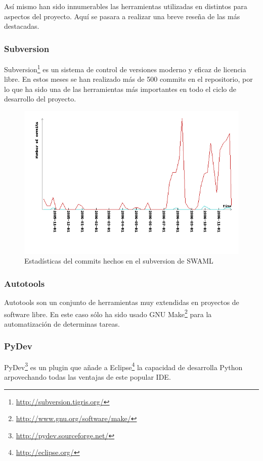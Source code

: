 Así mismo han sido innumerables las herramientas utilizadas en distintos para 
aspectos del proyecto. Aquí se pasara a realizar una breve reseña de las más 
destacadas.

\subsubsection{Subversion}

Subversion\footnote{\url{http://subversion.tigris.org/}} es un sistema de 
control de versiones moderno y eficaz de licencia libre. En estos meses se 
han realizado más de 500 commits en el repositorio, por lo que ha sido una
de las herramientas más importantes en todo el ciclo de desarrollo del
proyecto.

\begin{figure}[H]
	\centering
	\includegraphics[width=12cm]{images/svn-stats.png}
	\caption{Estadísticas del commits hechos en el subversion de SWAML}
	\label{fig:svnStats}
\end{figure}

\subsubsection{Autotools}

Autotools son un conjunto de herramientas muy extendidas en proyectos de
software libre. En este caso sólo ha sido usado GNU Make\footnote{\url{http://www.gnu.org/software/make/}}
para la automatización de determinas tareas.

\subsubsection{PyDev}

PyDev\footnote{\url{http://pydev.sourceforge.net/}} es un plugin que añade
a Eclipse\footnote{\url{http://eclipse.org/}} la capacidad de desarrolla
Python arpovechando todas las ventajas de este popular IDE.

